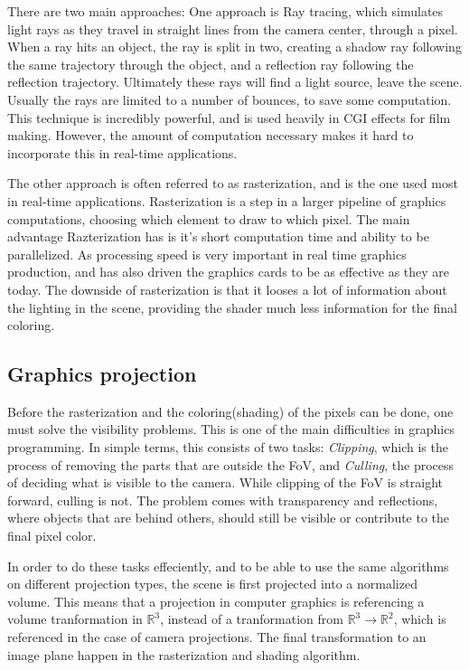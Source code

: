 There are two main approaches: One approach is Ray tracing, which simulates light rays as they travel in straight lines from the camera center, through a pixel. When a ray hits an object, the ray is split in two, creating a shadow ray following the same trajectory through the object, and a reflection ray following the reflection trajectory. Ultimately these rays will find a light source, leave the scene. Usually the rays are limited to a number of bounces, to save some computation. This technique is incredibly powerful, and is used heavily in CGI effects for film making. However, the amount of computation necessary makes it hard to incorporate this in real-time applications.

The other approach is often referred to as rasterization, and is the one used most in real-time applications. Rasterization is a step in a larger pipeline of graphics computations, choosing which element to draw to which pixel. The main advantage Razterization has is it's short computation time and ability to be parallelized. As processing speed is very important in real time graphics production, and has also driven the graphics cards to be as effective as they are today. The downside of rasterization is that it looses a lot of information about the lighting in the scene, providing the shader much less information for the final coloring.

\subsection{Graphics projection}

Before the rasterization and the coloring(shading) of the pixels can be done, one must solve the visibility problems. This is one of the main difficulties in graphics programming. In simple terms, this consists of two tasks: \emph{Clipping}, which is the process of removing the parts that are outside the FoV, and \emph{Culling}, the process of deciding what is visible to the camera. While clipping of the FoV is straight forward, culling is not. The problem comes with transparency and reflections, where objects that are behind others, should still be visible or contribute to the final pixel color. 

In order to do these tasks effeciently, and to be able to use the same algorithms on different projection types, the scene is first projected into a normalized volume. This means that a projection in computer graphics is referencing a volume tranformation in $\mathbb{R}^3$, instead of a tranformation from $\mathbb{R}^3 \rightarrow \mathbb{R}^2$, which is referenced in the case of camera projections. The final transformation to an image plane happen in the rasterization and shading algorithm.

